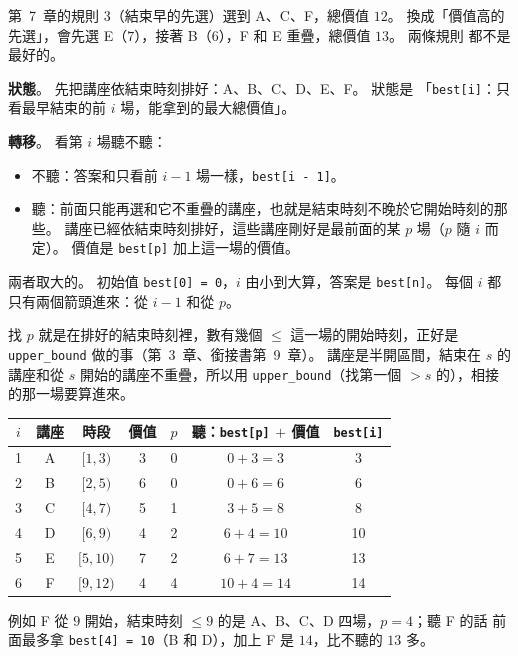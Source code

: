 第~7~章的規則 3（結束早的先選）選到 A、C、F，總價值 $12$。 換成「價值高的
先選」，會先選 E（$7$），接著 B（$6$），F 和 E 重疊，總價值 $13$。 兩條規則
都不是最好的。

\textbf{狀態}。 先把講座依結束時刻排好：A、B、C、D、E、F。 狀態是
「\texttt{best[i]}：只看最早結束的前 $i$ 場，能拿到的最大總價值」。

\textbf{轉移}。 看第 $i$ 場聽不聽：

\begin{itemize}
\item 不聽：答案和只看前 $i - 1$ 場一樣，\texttt{best[i - 1]}。
\item 聽：前面只能再選和它不重疊的講座，也就是結束時刻不晚於它開始時刻的那
些。 講座已經依結束時刻排好，這些講座剛好是最前面的某 $p$ 場（$p$ 隨 $i$ 而
定）。 價值是 \texttt{best[p]} 加上這一場的價值。
\end{itemize}

兩者取大的。 初始值 \texttt{best[0] = 0}，$i$ 由小到大算，答案是
\texttt{best[n]}。 每個 $i$ 都只有兩個箭頭進來：從 $i - 1$ 和從 $p$。

找 $p$ 就是在排好的結束時刻裡，數有幾個 $\le$ 這一場的開始時刻，正好是
\texttt{upper\_bound} 做的事（第~3~章、銜接書第~9~章）。
講座是半開區間，結束在 $s$ 的講座和從 $s$ 開始的講座不重疊，所以用
\texttt{upper\_bound}（找第一個 $> s$ 的），相接的那一場要算進來。

\begin{center}
\begin{tabular}{cccc|cc|c}
\toprule
$i$ & 講座 & 時段 & 價值 & $p$ & 聽：\texttt{best[p]} $+$ 價值 & \texttt{best[i]} \\
\midrule
1 & A & $[1, 3)$ & 3 & 0 & $0 + 3 = 3$ & 3 \\
2 & B & $[2, 5)$ & 6 & 0 & $0 + 6 = 6$ & 6 \\
3 & C & $[4, 7)$ & 5 & 1 & $3 + 5 = 8$ & 8 \\
4 & D & $[6, 9)$ & 4 & 2 & $6 + 4 = 10$ & 10 \\
5 & E & $[5, 10)$ & 7 & 2 & $6 + 7 = 13$ & 13 \\
6 & F & $[9, 12)$ & 4 & 4 & $10 + 4 = 14$ & 14 \\
\bottomrule
\end{tabular}
\end{center}

例如 F 從 $9$ 開始，結束時刻 $\le 9$ 的是 A、B、C、D 四場，$p = 4$；聽 F 的話
前面最多拿 \texttt{best[4] = 10}（B 和 D），加上 F 是 $14$，比不聽的 $13$ 多。

